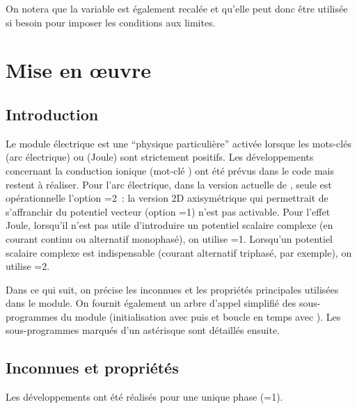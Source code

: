 \bigskip
On notera que la variable  est \'egalement recal\'ee et qu'elle
peut donc \^etre utilis\'ee si besoin pour imposer les conditions aux limites.

\section*{Mise en \oe uvre}


\subsection*{Introduction}

Le module \'electrique est une ``physique particuli\`ere'' activ\'ee lorsque les
mots-cl\'es  (arc \'electrique) ou 
(Joule) sont strictement positifs. Les d\'eveloppements concernant la conduction ionique
(mot-cl\'e ) ont \'et\'e pr\'evus dans le code mais restent \`a
r\'ealiser. Pour l'arc \'electrique, dans la version actuelle
de \CS, seule est op\'erationnelle l'option =2~: la version 2D axisym\'etrique qui permettrait de
        s'affranchir du potentiel vecteur (option =1) n'est pas
        activable.
Pour l'effet Joule, lorsqu'il n'est pas utile d'introduire un potentiel scalaire
complexe
(en courant continu ou alternatif monophas\'e), on utilise
=1. Lorsqu'un potentiel scalaire complexe est indispensable (courant
alternatif triphas\'e, par exemple), on utilise
=2.

Dans ce qui suit, on pr\'ecise les inconnues et les propri\'et\'es
principales utilis\'ees dans le module.
On fournit \'egalement un arbre d'appel simplifi\'e des sous-programmes du module
(initialisation avec  puis  et boucle en temps avec ).
Les sous-programmes marqu\'es d'un ast\'erisque sont d\'etaill\'es ensuite.

\newpage

\subsection*{Inconnues et propri\'et\'es}

Les d\'eveloppements ont \'et\'e r\'ealis\'es pour une unique phase (=1).

